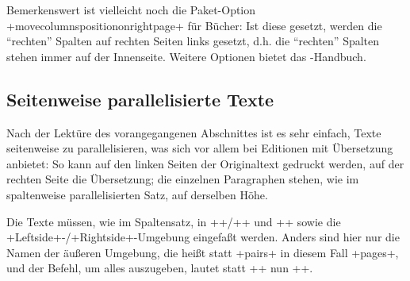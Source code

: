 Bemerkenswert ist vielleicht noch die Paket-Option +movecolumnspositiononrightpage+ für Bücher:
Ist diese gesetzt, werden die \enquote{rechten} Spalten auf rechten Seiten links gesetzt, d.h. die \enquote{rechten} Spalten stehen immer auf der Innenseite.
Weitere Optionen bietet das \reledpar-Handbuch.


\subsection{Seitenweise parallelisierte Texte}

Nach der Lektüre des vorangegangenen Abschnittes ist es sehr einfach, Texte seitenweise zu parallelisieren, was sich vor allem bei Editionen mit Übersetzung anbietet:
So kann auf den linken Seiten der Originaltext gedruckt werden, auf der rechten Seite die Übersetzung; die einzelnen Paragraphen stehen, wie im spaltenweise parallelisierten Satz, auf derselben Höhe.

Die Texte müssen, wie im Spaltensatz, in +\beginnumbering+/+\endnumbering+ und +\autopar+ sowie die +Leftside+-/+Rightside+-Umgebung eingefaßt werden.
Anders sind hier nur die Namen der äußeren Umgebung, die heißt statt +pairs+ in diesem Fall +pages+, und der Befehl, um alles auszugeben, lautet statt +\Columns+ nun +\Pages+.


